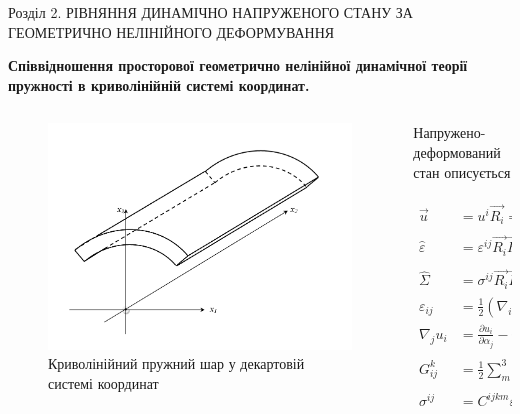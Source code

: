 \documentclass[8pt]{beamer}
\numberwithin{figure}{section}
\numberwithin{equation}{section}
\numberwithin{table}{section}
\begin{document}
\begin{frame}{Розділ 2. РІВНЯННЯ ДИНАМІЧНО НАПРУЖЕНОГО СТАНУ ЗА ГЕОМЕТРИЧНО НЕЛІНІЙНОГО ДЕФОРМУВАННЯ}

\textbf{Співвідношення просторової геометрично нелінійної динамічної теорії пружності в криволінійній системі координат.
}

\begin{columns}
	\begin{column}{0.35\linewidth}
		\begin{figure}
			\includegraphics[scale=0.15]{pic/layer.png}
			\caption{Криволінійний пружний шар у декартовій системі координат}
			\label{fig:21}
		\end{figure}
	\end{column}
	\begin{column}{0.65\textwidth}
    	\begin{center}
	    	Напружено-деформований стан описується
    	\end{center}
\begin{align}
\vec{u} &= u^i \vec{R_i}=u_i \vec{R^i},\\
\hat{\varepsilon} &= \varepsilon^{ij} \vec{R_i}\vec{R_j}=\varepsilon_{ij} \vec{R^i}\vec{R^j},\\
\hat{\Sigma} &= \sigma^{ij} \vec{R_i}\vec{R_j}=\sigma_{ij} \vec{R^i}\vec{R^j},\\
\varepsilon_{ij} &= \frac{1}{2} \left( \nabla_i u_j + \nabla_j u_i + \nabla_i u^j \nabla_j u_k \right),\\
\nabla_j u_i &= \frac{ \partial u_i }{ \partial \alpha_j } - u_k G ^k _{ij},\\
G ^k _{ij} &= \frac12 \sum_{m=1}^{3} g^{km} 
\left(
\frac{\partial g_{im}}{\partial \alpha_j} + \frac{\partial g_{jm}}{\partial \alpha_i} - \frac{\partial g_{ij}}{\partial \alpha_m} 
\right), \\
\sigma^{ij} &= C^{ijkm}\varepsilon_{km}.
\end{align}
	\end{column}
\end{columns}


\end{frame}
\end{document}
